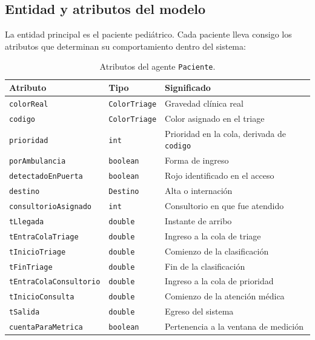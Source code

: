 \documentclass{article}
\begin{document}
\subsection{Entidad y atributos del modelo}
\label{sec:entidad}

La entidad principal es el paciente pediátrico. Cada paciente lleva consigo
los atributos que determinan su comportamiento dentro del sistema:

\begin{table}[H]
\centering
\begin{tabular}{lll}
\toprule
\textbf{Atributo} & \textbf{Tipo} & \textbf{Significado} \\
\midrule
\texttt{colorReal}            & \texttt{ColorTriage} & Gravedad clínica real \\
\texttt{codigo}               & \texttt{ColorTriage} & Color asignado en el triage \\
\texttt{prioridad}            & \texttt{int}         & Prioridad en la cola, derivada de \texttt{codigo} \\
\texttt{porAmbulancia}        & \texttt{boolean}     & Forma de ingreso \\
\texttt{detectadoEnPuerta}    & \texttt{boolean}     & Rojo identificado en el acceso \\
\texttt{destino}              & \texttt{Destino}     & Alta o internación \\
\texttt{consultorioAsignado}  & \texttt{int}         & Consultorio en que fue atendido \\
\texttt{tLlegada}             & \texttt{double}      & Instante de arribo \\
\texttt{tEntraColaTriage}     & \texttt{double}      & Ingreso a la cola de triage \\
\texttt{tInicioTriage}        & \texttt{double}      & Comienzo de la clasificación \\
\texttt{tFinTriage}           & \texttt{double}      & Fin de la clasificación \\
\texttt{tEntraColaConsultorio}& \texttt{double}      & Ingreso a la cola de prioridad \\
\texttt{tInicioConsulta}      & \texttt{double}      & Comienzo de la atención médica \\
\texttt{tSalida}              & \texttt{double}      & Egreso del sistema \\
\texttt{cuentaParaMetrica}    & \texttt{boolean}     & Pertenencia a la ventana de medición \\
\bottomrule
\end{tabular}
\caption{Atributos del agente \texttt{Paciente}.}
\end{table}
\end{document}

